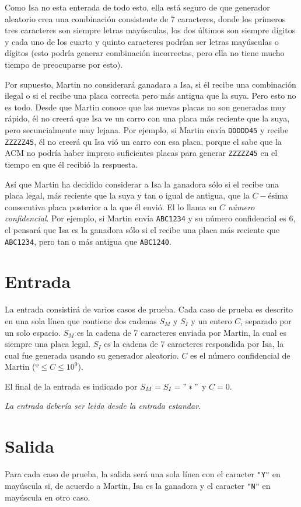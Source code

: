 \documentclass[a4paper,12pt]{article}
\begin{document}
Como Isa no esta enterada de todo esto, ella está seguro de que generador aleatorio crea una combinación consistente de 7 caracteres, donde los primeros tres caracteres son siempre letras mayúsculas, los dos últimos son siempre dígitos y cada uno de los cuarto y quinto caracteres podrían ser letras mayúsculas o dígitos (esto podría generar combinación incorrectas, pero ella no tiene mucho tiempo de preocuparse por esto).

Por supuesto, Martin no considerará ganadara a Isa, si él recibe una combinación ilegal o si el recibe una placa correcta pero más antigua que la suya. Pero esto no es todo. Desde que Martin conoce que las nuevas placas no son generadas muy rápido, él no creerá que Isa ve un carro con una placa más reciente que la suya, pero secuncialmente muy lejana. Por ejemplo, si Martin envía \verb|DDDDD45| y recibe \verb|ZZZZZ45|, él no creerá qu Isa vió un carro con esa placa, porque el sabe que la ACM no podría haber impreso suficientes placas para generar \verb|ZZZZZ45| en el tiempo en que él recibió la respuesta.

Así que Martin ha decidido considerar a Isa la ganadora sólo si el recibe una placa legal, más reciente que la suya y tan o igual de antigua, que la $C-$ésima consecutiva placa posterior a la que él envió. El lo llama su $C$ \emph{número confidencial}. Por ejemplo, si Martin envía \verb|ABC1234| y su número confidencial es 6, el pensará que Isa es la ganadora sólo si el recibe una placa más reciente que \verb|ABC1234|, pero tan o más antigua que \verb|ABC1240|.

\section*{Entrada}

La entrada consistirá de varios casos de prueba. Cada caso de prueba es descrito en una sola línea que contiene dos cadenas $S_M$ y $S_I$ y un entero $C$, separado por un solo espacio. $S_M$ es la cadena de 7 caracteres enviada por Martin, la cual es siempre una placa legal. $S_I$ es la cadena de 7 caracteres respondida por Isa, la cual fue generada usando su generador aleatorio. $C$ es el número confidencial de Martin ($º \leq C \leq 10^9$).

El final de la entrada es indicado por $S_M = S_I = "*"$ y $C = 0$.

\emph{La entrada debería ser leida desde la entrada estandar.}

\section*{Salida}
Para cada caso de prueba, la salida será una sola línea con el caracter \verb|"Y"| en mayúscula si, de acuerdo a Martin, Isa es la ganadora y el caracter \verb|"N"| en mayúscula en otro caso.
\end{document}
